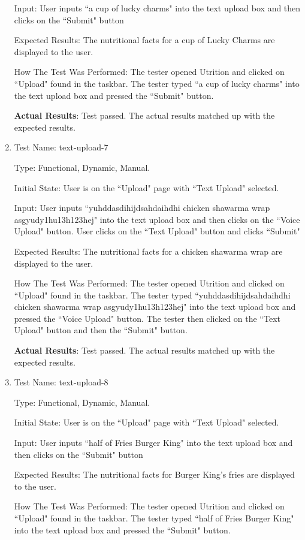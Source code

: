 \documentclass[12pt, titlepage]{article}
\begin{document}
\begin{enumerate}
		Input: User inputs ``a cup of lucky charms" into the text upload box and then clicks on the ``Submit" button
		
		Expected Results: The nutritional facts for a cup of Lucky Charms are displayed to the user.
		
		How The Test Was Performed: The tester opened Utrition and clicked on ``Upload" found in the taskbar. The tester typed ``a cup of lucky charms" into the text upload box and pressed the ``Submit" button.
		
		\textbf{Actual Results}: Test passed. The actual results matched up with the expected results.
		
		\item{Test Name: text-upload-7}
		
		Type: Functional, Dynamic, Manual.
		
		Initial State: User is on the ``Upload" page with ``Text Upload" selected.
		
		Input: User inputs ``yuhddasdihijdsahdaihdhi chicken shawarma wrap asgyudy1hu13h123hej" into the text upload box and then clicks on the ``Voice Upload" button. User clicks on the ``Text Upload" button and clicks ``Submit"
		
		Expected Results: The nutritional facts for a chicken shawarma wrap are displayed to the user.
		
		How The Test Was Performed: The tester opened Utrition and clicked on ``Upload" found in the taskbar. The tester typed ``yuhddasdihijdsahdaihdhi chicken shawarma wrap asgyudy1hu13h123hej" into the text upload box and pressed the ``Voice Upload" button. The tester then clicked on the ``Text Upload" button and then the ``Submit" button.
		
		\textbf{Actual Results}: Test passed. The actual results matched up with the expected results.
		
		\item{Test Name: text-upload-8}
		
		Type: Functional, Dynamic, Manual.
		
		Initial State: User is on the ``Upload" page with ``Text Upload" selected.
		
		Input: User inputs ``half of Fries Burger King" into the text upload box and then clicks on the ``Submit" button
		
		Expected Results: The nutritional facts for Burger King's fries are displayed to the user.
		
		How The Test Was Performed: The tester opened Utrition and clicked on ``Upload" found in the taskbar. The tester typed ``half of Fries Burger King" into the text upload box and pressed the ``Submit" button.
		

\end{enumerate}
\end{document}

